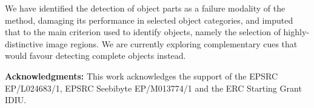 \documentclass[10pt,twocolumn,letterpaper]{article}
\begin{document}
We have identified the detection of object parts as a failure modality of the method, damaging its performance in selected object categories, and imputed that to the main criterion used to identify objects, namely the selection of highly-distinctive image regions. We are currently exploring complementary cues that would favour detecting complete objects instead.


{\small
\textbf{Acknowledgments:} This work acknowledges the support of the EPSRC EP/L024683/1, EPSRC Seebibyte EP/M013774/1 and the ERC Starting Grant IDIU. 
}

\clearpage{
\small


}
\end{document}
